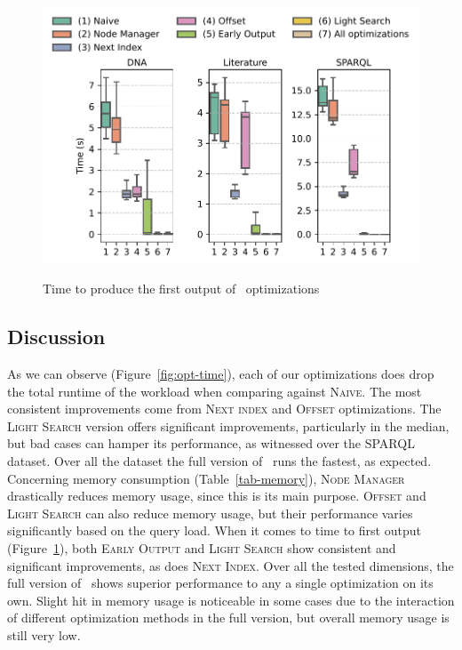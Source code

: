 \begin{figure}[t]
	\centering
	\includegraphics[width=.8\textwidth]{figures/versions-fot.pdf}
	\label{fig:opt-firstOT}
	\caption{Time to produce the first output of \rematch\ optimizations}
	\label{fig-optimizations}
\end{figure}



\subsection{Discussion}
As we can observe (Figure~\ref{fig:opt-time}), each of our optimizations does
drop the total runtime of the workload when comparing against \textsc{Naive}.
The most consistent improvements come from \textsc{Next index} and
\textsc{Offset} optimizations. The \textsc{Light Search} version offers
significant improvements, particularly in the median, but bad cases can hamper
its performance, as witnessed over the \textsf{SPARQL} dataset. Over all the
dataset the full version of \rematch\ runs the fastest, as expected. Concerning
memory consumption (Table~\ref{tab-memory}), \textsc{Node Manager} drastically
reduces memory usage, since this is its main purpose. \textsc{Offset} and
\textsc{Light Search} can also reduce memory usage, but their performance varies
significantly based on the query load. When it comes to time to first output
(Figure~\ref{fig-optimizations}), both \textsc{Early Output} and \textsc{Light
Search} show consistent and significant improvements, as does \textsc{Next
Index}. Over all the tested dimensions, the full version of \rematch\ shows
superior performance to any a single optimization on its own. Slight hit in
memory usage is noticeable in some cases due to the interaction of different
optimization methods in the full version, but overall memory usage is still very
low.


